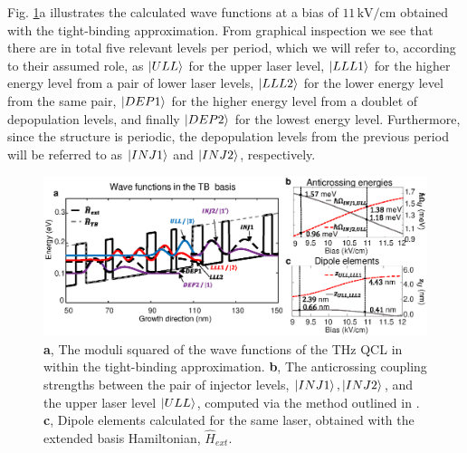 \documentclass[10pt,letterpaper]{article}%
\begin{document}
Fig. \ref{fig:img02}a illustrates the calculated wave functions at a bias of
$11{\,}\mathrm{kV}/\mathrm{cm}$ obtained with the tight-binding approximation.
From graphical inspection we see that there are in total five relevant
levels per period, which we will refer to, according to their assumed role, as
$\Ket{ULL}$ for the upper laser level, $\Ket{LLL1}$ for the higher energy
level from a pair of lower laser levels, $\Ket{LLL2}$ for the lower energy
level from the same pair, $\Ket{DEP1}$ for the higher energy level from a
doublet of depopulation levels, and finally $\Ket{DEP2}$ for the lowest energy
level. Furthermore, since the structure is periodic, the depopulation levels
from the previous period will be referred to as $\Ket{INJ1}$ and $\Ket{INJ2}$, respectively.

\begin{figure}[h]
\begin{center}
\includegraphics[width=12cm]{figs/FL183S.eps}
\end{center}
\caption{\textbf{a}, The moduli squared of the wave functions of the THz QCL
in \cite{burghoff2014terahertz} within the tight-binding approximation.
\textbf{b}, The anticrossing coupling strengths between the pair of injector
levels, $\ket{INJ1},\ket{INJ2}$, and the upper laser level $\ket{ULL}$,
computed via the method outlined in \cite{bastardwave}. \textbf{c}, Dipole
elements calculated for the same laser, obtained with the extended basis
Hamiltonian, $\hat{H}_{ext}$.}%
\label{fig:img02}%
\end{figure}
\end{document}
